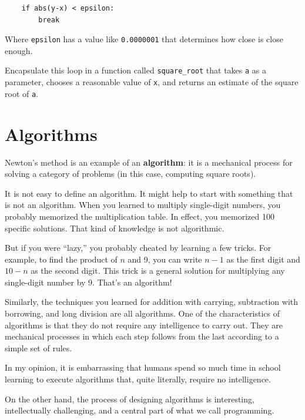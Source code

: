 \documentclass[10pt]{book}
\begin{document}
\begin{CJK}{UTF8}{gbsn}
\begin{verbatim}
    if abs(y-x) < epsilon:
        break
\end{verbatim}
%
Where \verb"epsilon" has a value like {\tt 0.0000001} that
determines how close is close enough.

\begin{exercise}

Encapsulate this loop in a function called \verb"square_root"
that takes {\tt a} as a parameter, chooses a reasonable
value of {\tt x}, and returns an estimate of the square root
of {\tt a}.

\end{exercise}


\section{Algorithms}

Newton's method is an example of an {\bf algorithm}: it is a
mechanical process for solving a category of problems (in this
case, computing square roots).

It is not easy to define an algorithm.  It might help to start
with something that is not an algorithm.  When you learned
to multiply single-digit numbers, you probably memorized the
multiplication table.  In effect, you memorized 100 specific solutions.
That kind of knowledge is not algorithmic.

But if you were ``lazy,'' you probably cheated by learning a few
tricks.  For example, to find the product of $n$ and 9, you can
write $n-1$ as the first digit and $10-n$ as the second
digit.  This trick is a general solution for multiplying any
single-digit number by 9.  That's an algorithm!

Similarly, the techniques you learned for addition with carrying,
subtraction with borrowing, and long division are all algorithms.  One
of the characteristics of algorithms is that they do not require any
intelligence to carry out.  They are mechanical processes in which
each step follows from the last according to a simple set of rules.

In my opinion, it is embarrassing that humans spend so much time in
school learning to execute algorithms that, quite literally, require
no intelligence.

On the other hand, the process of designing algorithms is interesting,
intellectually challenging, and a central part of what we call
programming.


\end{CJK}
\end{document}
